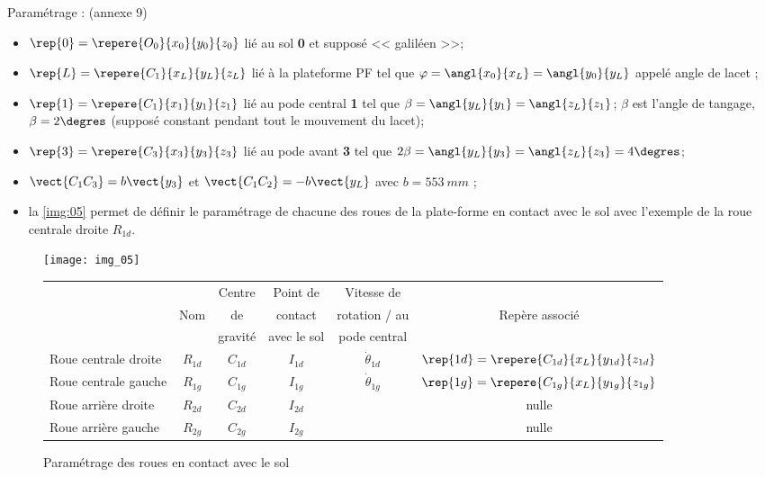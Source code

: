 Paramétrage : (annexe 9)
\begin{itemize}
\item $\rep{0}=\repere{O_0}{x_0}{y_0}{z_0}$ lié au sol \textbf{0} et supposé << galiléen >>;
\item $\rep{L}=\repere{C_1}{x_L}{y_L}{z_L}$ lié à la plateforme PF tel que $\varphi=\angl{x_0}{x_L}=\angl{y_0}{y_L}$ appelé angle de lacet ;
\item $\rep{1}=\repere{C_1}{x_1}{y_1}{z_1}$ lié au pode central \textbf{1} tel que $\beta=\angl{y_L}{y_1}=\angl{z_L}{z_1}$; $\beta$ est l'angle de tangage, $\beta=2\degres$ (supposé constant pendant tout le mouvement du lacet);
\item $\rep{3}=\repere{C_3}{x_3}{y_3}{z_3}$ lié au pode avant \textbf{3} tel que $2\beta=\angl{y_L}{y_3}=\angl{z_L}{z_3}=4\degres$;
\item $\vect{C_1C_3}=b\vect{y_3}$ et $\vect{C_1C_2}=-b\vect{y_L}$ avec $b = \SI{553}{mm}$ ;
\item la \autoref{img:05} permet de définir le paramétrage de chacune des roues de la plate-forme en contact avec le sol avec
l’exemple de la roue centrale droite $R_{1d}$.
\end{itemize}

\begin{figure}[!h]
\centering
\texttt{[image: img\_05]}

\vspace{.5cm}

\begin{tabular}{lccccc}
\hline
&  & Centre & Point de & Vitesse de &  \\
&    Nom     &de         & contact  & rotation / au & Repère associé \\
&        & gravité & avec le sol & pode central & \\ \hline
Roue centrale droite & $R_{1d}$ & $C_{1d}$ & $I_{1d}$ & $\dot{\theta}_{1d}$ & $\rep{1d}=\repere{C_{1d}}{x_L}{y_{1d}}{z_{1d}}$ \\ \hline
Roue centrale gauche & $R_{1g}$ & $C_{1g}$ & $I_{1g}$ & $\dot{\theta}_{1g}$ & $\rep{1g}=\repere{C_{1g}}{x_L}{y_{1g}}{z_{1g}}$ \\ \hline
Roue arrière droite & $R_{2d}$ & $C_{2d}$ & $I_{2d}$ & & nulle \\ \hline
Roue arrière gauche & $R_{2g}$ & $C_{2g}$ & $I_{2g}$ & & nulle \\ \hline
\end{tabular}

\caption{Paramétrage des roues en contact avec le sol \label{img:05}}
\end{figure}

